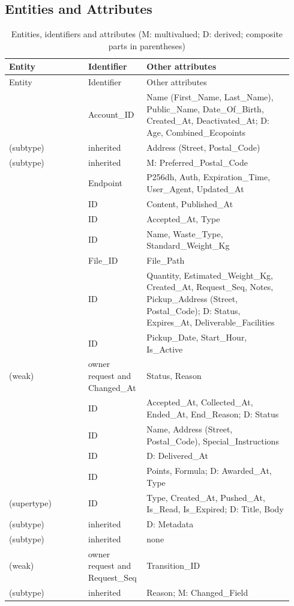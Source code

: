 \documentclass[11pt,letterpaper]{article}
\begin{document}
\subsection{Entities and Attributes}
{\small
\begin{longtable}{@{}L{0.27\linewidth}L{0.17\linewidth}L{0.50\linewidth}@{}}
\caption{Entities, identifiers and attributes (M: multivalued; D: derived; composite parts in parentheses)}\label{tab:entities}\\
\toprule
Entity & Identifier & Other attributes \\
\midrule
\endfirsthead
\toprule
Entity & Identifier & Other attributes \\
\midrule
\endhead
\bottomrule
\endfoot
{} & Account\_ID & Name (First\_Name, Last\_Name), Public\_Name, Date\_Of\_Birth, Created\_At, Deactivated\_At; D: Age, Combined\_Ecopoints \\
 (subtype) & inherited & Address (Street, Postal\_Code) \\
 (subtype) & inherited & M: Preferred\_Postal\_Code \\
 & Endpoint & P256dh, Auth, Expiration\_Time, User\_Agent, Updated\_At \\
 & ID & Content, Published\_At \\
 & ID & Accepted\_At, Type \\
 & ID & Name, Waste\_Type, Standard\_Weight\_Kg \\
 & File\_ID & File\_Path \\
 & ID & Quantity, Estimated\_Weight\_Kg, Created\_At, Request\_Seq, Notes, Pickup\_Address (Street, Postal\_Code); D: Status, Expires\_At, Deliverable\_Facilities \\
 & ID & Pickup\_Date, Start\_Hour, Is\_Active \\
 (weak) & owner request and Changed\_At & Status, Reason \\
 & ID & Accepted\_At, Collected\_At, Ended\_At, End\_Reason; D: Status \\
 & ID & Name, Address (Street, Postal\_Code), Special\_Instructions \\
 & ID & D: Delivered\_At \\
 & ID & Points, Formula; D: Awarded\_At, Type \\
 (supertype) & ID & Type, Created\_At, Pushed\_At, Is\_Read, Is\_Expired; D: Title, Body \\
 (subtype) & inherited & D: Metadata \\
 (subtype) & inherited & none \\
 (weak) & owner request and Request\_Seq & Transition\_ID \\
 (subtype) & inherited & Reason; M: Changed\_Field \\
\end{longtable}
}
\end{document}
